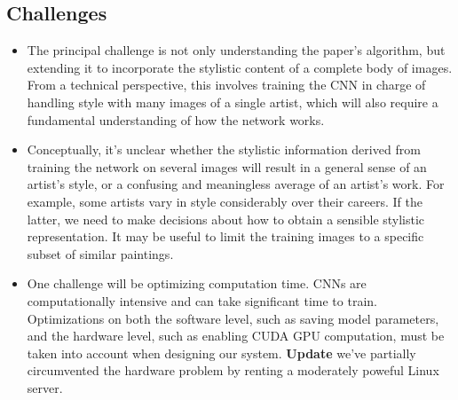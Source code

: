 \documentclass[letterpaper,10pt]{article}
\begin{document}
\subsection*{Challenges}

\begin{itemize}
    \item The principal challenge is not only understanding the paper's
      algorithm, but extending it to incorporate the stylistic content of a
      complete body of images. From a technical perspective, this involves
      training the CNN in charge of handling style with many images of a single
      artist, which will also require a fundamental understanding of how the
      network works.
    \item Conceptually, it's unclear whether the stylistic information derived
      from training the network on several images will result in a general
      sense of an artist's style, or a confusing and meaningless average of an
      artist's work. For example, some artists vary in style considerably over
      their careers. If the latter, we need to make decisions about
      how to obtain a sensible stylistic representation. It may be useful to
      limit the training images to a specific subset of similar paintings.
    \item One challenge will be optimizing computation time. CNNs are
      computationally intensive and can take significant time to train.
      Optimizations on both the software level, such as saving model
      parameters, and the hardware level, such as enabling CUDA GPU
      computation, must be taken into account when designing our system.
\textbf{Update} we've partially circumvented the hardware problem by renting a
moderately poweful Linux server.
\end{itemize}


\nocite{*} %

{}
\end{document}
